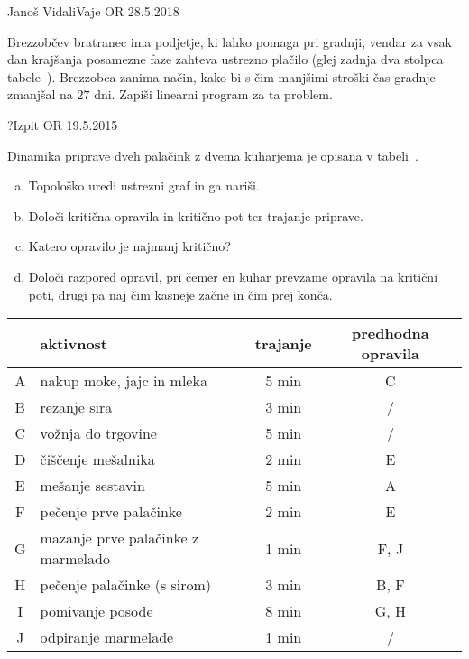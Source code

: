 \begin{naloga}{Janoš Vidali}{Vaje OR 28.5.2018}
\begin{vprasanje}
Brezzobčev bratranec ima podjetje, ki lahko pomaga pri gradnji,
vendar za vsak dan krajšanja posamezne faze zahteva ustrezno plačilo
(glej zadnja dva stolpca tabele~).
Brezzobca zanima način,
kako bi s čim manjšimi stroški čas gradnje zmanjšal na $27$ dni.
Zapiši linearni program za ta problem.
\end{vprasanje}
\begin{odgovor}
\end{odgovor}
\end{naloga}


\begin{naloga}{?}{Izpit OR 19.5.2015}
\begin{vprasanje}[palacinke]
Dinamika priprave dveh palačink z dvema kuharjema
je opisana v tabeli~\tab{}.
\begin{enumerate}[(a)]
\item Topološko uredi ustrezni graf in ga nariši.
\item Določi kritična opravila in kritično pot ter trajanje priprave.
\item Katero opravilo je najmanj kritično?
\item Določi razpored opravil,
pri čemer en kuhar prevzame opravila na kritični poti,
drugi pa naj čim kasneje začne in čim prej konča.
\end{enumerate}

\begin{tabela}
\begin{tabular}{c|l|c|c}
& aktivnost & trajanje & predhodna opravila \\
\hline
A & nakup moke, jajc in mleka & 5 min & C \\
B & rezanje sira & 3 min & / \\
C & vožnja do trgovine & 5 min & / \\
D & čiščenje mešalnika & 2 min & E \\
E & mešanje sestavin & 5 min & A \\
F & pečenje prve palačinke & 2 min & E \\
G & mazanje prve palačinke z marmelado & 1 min & F, J \\
H & pečenje palačinke (s sirom) & 3 min & B, F \\
I & pomivanje posode & 8 min & G, H \\
J & odpiranje marmelade & 1 min & / \\
\end{tabular}
\end{tabela}
\end{vprasanje}
\begin{odgovor}
\end{odgovor}
\end{naloga}


